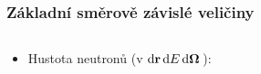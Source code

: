 \begin{frame}
  \frametitle{Základní směrově závislé veličiny}

  \begin{columns}[c]
  \begin{column}{.60\linewidth}  
    \begin{itemize}
    \item Hustota neutronů (v $\mathrm{d}\mathbf{r}\,\mathrm{d}E\,\mathrm{d}\mathbf{\Omega}\,$):
  \end{itemize}
  \end{column}
  \begin{column}{.30\linewidth}  
  \end{column}
  \end{columns}
  

\end{frame}
